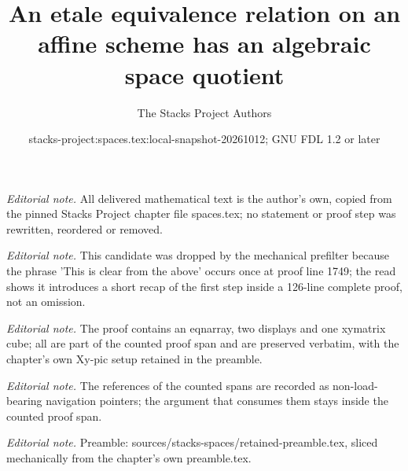 \documentclass[10pt,a4paper]{amsart}
\title{An etale equivalence relation on an affine scheme has an algebraic space quotient}
\author{The Stacks Project Authors}
\date{stacks-project:spaces.tex:local-snapshot-20261012; GNU FDL 1.2 or later}
\theoremstyle{plain}
\theoremstyle{definition}
\theoremstyle{remark}
\numberwithin{equation}{subsection}
\begin{document}
\maketitle
\setcounter{subsection}{1}
\noindent\textit{Editorial note.} All delivered mathematical text is the author's own, copied from the pinned Stacks Project chapter file spaces.tex; no statement or proof step was rewritten, reordered or removed.\par\medskip
\noindent\textit{Editorial note.} This candidate was dropped by the mechanical prefilter because the phrase 'This is clear from the above' occurs once at proof line 1749; the read shows it introduces a short recap of the first step inside a 126-line complete proof, not an omission.\par\medskip
\noindent\textit{Editorial note.} The proof contains an eqnarray, two displays and one xymatrix cube; all are part of the counted proof span and are preserved verbatim, with the chapter's own Xy-pic setup retained in the preamble.\par\medskip
\noindent\textit{Editorial note.} The references of the counted spans are recorded as non-load-bearing navigation pointers; the argument that consumes them stays inside the counted proof span.\par\medskip
\noindent\textit{Editorial note.} Preamble: sources/stacks-spaces/retained-preamble.tex, sliced mechanically from the chapter's own preamble.tex.\par\medskip
\end{document}
